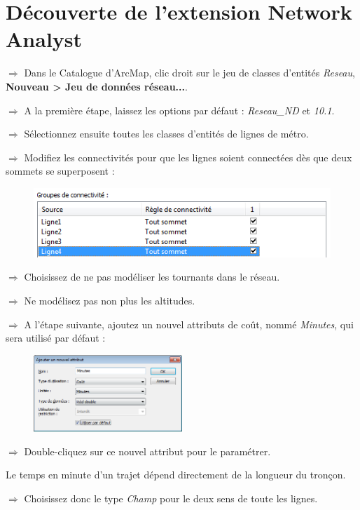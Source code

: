 \documentclass[11pt]{article}
\newcommand{\action}{$\Rightarrow$ }
\begin{document}
\section{Découverte de l'extension Network Analyst}

\action Dans le Catalogue d'ArcMap, clic droit sur le jeu de classes d'entités \textit{Reseau}, \textbf{Nouveau > Jeu de données réseau...}.

\action A la première étape, laissez les options par défaut : \textit{Reseau\_ND} et \textit{10.1}.

\action Sélectionnez ensuite toutes les classes d'entités de lignes de métro.

\action Modifiez les connectivités pour que les lignes soient connectées dès que deux sommets se superposent :
\begin{figure}[H]
	\center \includegraphics{img/td3b/network_analyst-8.png} \\
\end{figure}

\action Choisissez de ne pas modéliser les tournants dans le réseau.

\action Ne modélisez pas non plus les altitudes.

\action A l'étape suivante, ajoutez un nouvel attributs de coût, nommé \textit{Minutes}, qui sera utilisé par défaut :
\begin{figure}[H]
	\center \includegraphics[width=0.5\textwidth]{img/td3b/network_analyst-5.png} \\
\end{figure}

\action Double-cliquez sur ce nouvel attribut pour le paramétrer.

Le temps en minute d'un trajet dépend directement de la longueur du tronçon.

\action Choisissez donc le type \textit{Champ} pour le deux sens de toute les lignes.
\end{document}
